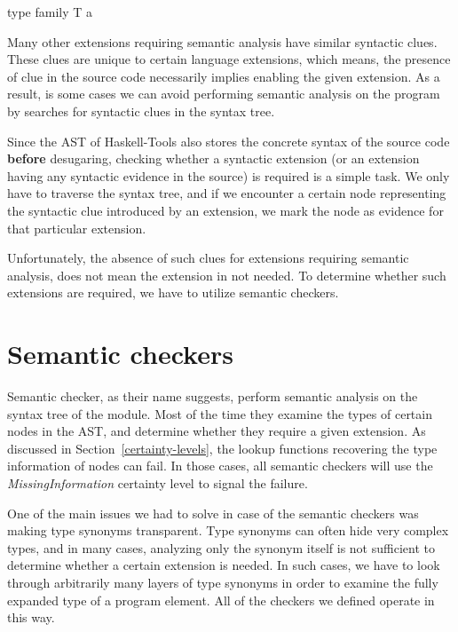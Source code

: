 \documentclass[main.tex]{subfiles}
\begin{document}
	\begin{oneLineHaskell}
		type family T a
	\end{oneLineHaskell}
	
	Many other extensions requiring semantic analysis have similar syntactic clues. These clues are unique to certain language extensions, which means, the presence of clue in the source code necessarily implies enabling the given extension. As a result, is some cases we can avoid performing semantic analysis on the program by searches for syntactic clues in the syntax tree.
	
	Since the AST of Haskell-Tools also stores the concrete syntax of the source code \textbf{before} desugaring, checking whether a syntactic extension (or an extension having any syntactic evidence in the source) is required is a simple task. We only have to traverse the syntax tree, and if we encounter a certain node representing the syntactic clue introduced by an extension, we mark the node as evidence for that particular extension.
	
	Unfortunately, the absence of such clues for extensions requiring semantic analysis, does not mean the extension in not needed. To determine whether such extensions are required, we have to utilize semantic checkers.
	
	\section{Semantic checkers}
		
	Semantic checker, as their name suggests, perform semantic analysis on the syntax tree of the module. Most of the time they examine the types of certain nodes in the AST, and determine whether they require a given extension. As discussed in Section~\ref{certainty-levels}, the lookup functions recovering the type information of nodes can fail. In those cases, all semantic checkers will use the \emph{MissingInformation} certainty level to signal the failure.
	
	One of the main issues we had to solve in case of the semantic checkers was making type synonyms transparent. Type synonyms can often hide very complex types, and in many cases, analyzing only the synonym itself is not sufficient to determine whether a certain extension is needed. In such cases, we have to look through arbitrarily many layers of type synonyms in order to examine the fully expanded type of a program element. All of the checkers we defined operate in this way.
\end{document}
